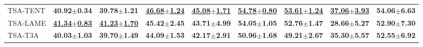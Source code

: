 \begin{table*}[t]
\begin{center}
{\begin{tabular}{lcccccccc}
\midrule
TSA-TENT & \textbf{40.92$\pm$0.34} & \textbf{39.78$\pm$1.21} & \underline{\textbf{46.68$\pm$1.24}} & \underline{\textbf{45.08$\pm$1.71}} & \underline{\textbf{54.78$\pm$0.80}} & \underline{\textbf{53.61$\pm$1.24}} & \underline{\textbf{37.06$\pm$3.93}} & \textbf{54.06$\pm$6.63}
\\
TSA-LAME & \underline{\textbf{41.34$\pm$0.83}} & \underline{\textbf{41.23$\pm$1.70}} & \textbf{45.42$\pm$2.45} & \textbf{43.71$\pm$4.99} & \textbf{54.05$\pm$1.05} & \textbf{52.76$\pm$1.47} & \textbf{28.66$\pm$5.27} & \textbf{52.90$\pm$7.30}
\\
TSA-T3A & \textbf{40.03$\pm$1.03} & \textbf{39.70$\pm$1.49} & \textbf{44.09$\pm$1.53} & \textbf{42.17$\pm$2.91} & \textbf{50.96$\pm$1.68} & \textbf{49.21$\pm$2.67} & \textbf{35.30$\pm$5.57} & \textbf{52.55$\pm$6.92}
\\
\bottomrule
\end{tabular}
}
\end{center}
\vspace{-4mm}
\end{table*}



